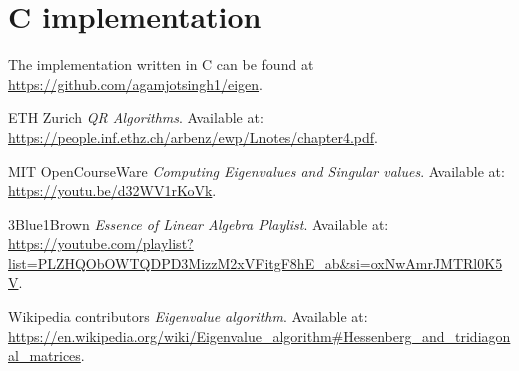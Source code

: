 \documentclass[12pt]{article}
\numberwithin{equation}{section}
\begin{document}
\section{C implementation}
The implementation written in C can be found at 
\newline
\url{https://github.com/agamjotsingh1/eigen}.
\begin{thebibliography}{4}

ETH Zurich \textit{QR Algorithms}. Available at: \url{https://people.inf.ethz.ch/arbenz/ewp/Lnotes/chapter4.pdf}.

MIT OpenCourseWare \textit{Computing Eigenvalues and Singular values}. Available at: \url{https://youtu.be/d32WV1rKoVk}.

3Blue1Brown \textit{Essence of Linear Algebra Playlist}. Available at: \url{https://youtube.com/playlist?list=PLZHQObOWTQDPD3MizzM2xVFitgF8hE_ab&si=oxNwAmrJMTRl0K5V}.

Wikipedia contributors \textit{Eigenvalue algorithm}. Available at: \url{https://en.wikipedia.org/wiki/Eigenvalue_algorithm#Hessenberg_and_tridiagonal_matrices}.
\end{thebibliography}
\end{document}
